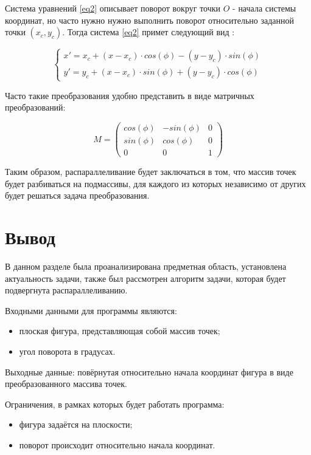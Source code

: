 \documentclass[12pt]{report}
\begin{document}
	Система уравнений \ref{eq2} описывает поворот вокруг точки $O$ - начала системы координат, но часто нужно нужно выполнить поворот относительно заданной точки $(x_c, y_c)$. Тогда система \ref{eq2} примет следующий вид \cite{rot}:
	
	\begin{equation}
		\label{eq3}
		\begin{cases}
			x'=x_c+(x-x_c) \cdot cos(\phi)-(y-y_c) \cdot sin(\phi)\\
			y'=y_c+(x-x_c) \cdot sin(\phi)+(y-y_c) \cdot cos(\phi)
		\end{cases}
	\end{equation}

	Часто такие преобразования удобно представить в виде матричных преобразований:
	
	\begin{equation}
		M=
		\begin{pmatrix}
			cos(\phi) & -sin(\phi) & 0 \\
			sin(\phi) & cos(\phi) & 0 \\
			0 & 0 & 1
		\end{pmatrix}
	\end{equation}

	Таким образом, распараллеливание будет заключаться в том, что массив точек будет разбиваться на подмассивы, для каждого из которых независимо от других будет решаться задача преобразования.
	
	\newpage
	
	\section{Вывод}
	В данном разделе была проанализирована предметная область, установлена актуальность задачи, также был рассмотрен алгоритм задачи, которая будет подвергнута распараллеливанию.
	
	Входными данными для программы являются:
	
	\begin{itemize}
		\item плоская фигура, представляющая собой массив точек;
		\item угол поворота в градусах.
	\end{itemize}

	Выходные данные: повёрнутая относительно начала координат фигура в виде преобразованного массива точек.
	
	Ограничения, в рамках которых будет работать программа:
	
	\begin{itemize}
		\item фигура задаётся на плоскости;
		\item поворот происходит относительно начала координат.
	\end{itemize}
\end{document}

